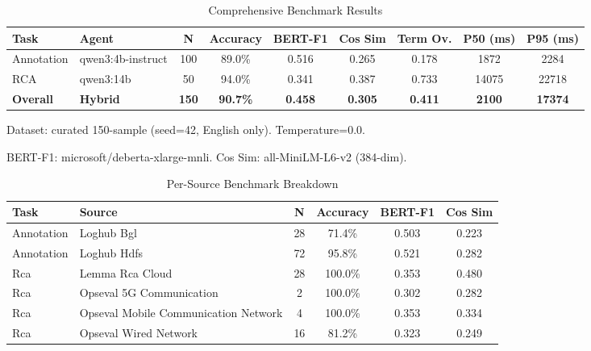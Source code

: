 
\begin{table}[h]
\centering
\caption{Comprehensive Benchmark Results}
\label{tab:comprehensive-results}
\begin{tabular}{llccccccc}
\toprule
\textbf{Task} & \textbf{Agent} & \textbf{N} & \textbf{Accuracy} & \textbf{BERT-F1} & \textbf{Cos Sim} & \textbf{Term Ov.} & \textbf{P50 (ms)} & \textbf{P95 (ms)} \\
\midrule
Annotation & qwen3:4b-instruct & 100 & 89.0\% & 0.516 & 0.265 & 0.178 & 1872 & 2284 \\
RCA & qwen3:14b & 50 & 94.0\% & 0.341 & 0.387 & 0.733 & 14075 & 22718 \\
\midrule
\textbf{Overall} & \textbf{Hybrid} & \textbf{150} & \textbf{90.7\%} & \textbf{0.458} & \textbf{0.305} & \textbf{0.411} & \textbf{2100} & \textbf{17374} \\
\bottomrule
\end{tabular}
\begin{tablenotes}
\small
\item Dataset: curated 150-sample (seed=42, English only). Temperature=0.0.
\item BERT-F1: microsoft/deberta-xlarge-mnli. Cos Sim: all-MiniLM-L6-v2 (384-dim).
\end{tablenotes}
\end{table}


\begin{table}[h]
\centering
\caption{Per-Source Benchmark Breakdown}
\label{tab:per-source}
\begin{tabular}{llcccc}
\toprule
\textbf{Task} & \textbf{Source} & \textbf{N} & \textbf{Accuracy} & \textbf{BERT-F1} & \textbf{Cos Sim} \\
\midrule
Annotation & Loghub Bgl & 28 & 71.4\% & 0.503 & 0.223 \\
Annotation & Loghub Hdfs & 72 & 95.8\% & 0.521 & 0.282 \\
Rca & Lemma Rca Cloud & 28 & 100.0\% & 0.353 & 0.480 \\
Rca & Opseval 5G Communication & 2 & 100.0\% & 0.302 & 0.282 \\
Rca & Opseval Mobile Communication Network & 4 & 100.0\% & 0.353 & 0.334 \\
Rca & Opseval Wired Network & 16 & 81.2\% & 0.323 & 0.249 \\
\bottomrule
\end{tabular}
\end{table}



